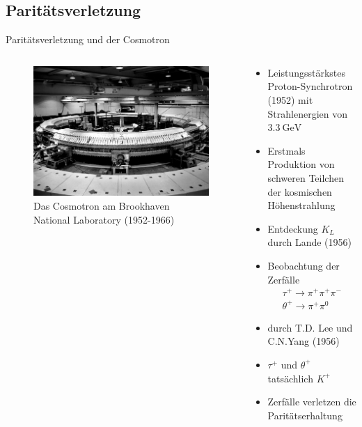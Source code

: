 \documentclass[aspectratio=1610, professionalfonts, 9pt, t]{beamer}
\begin{document}
\subsection{Paritätsverletzung}

  \begin{frame}{Paritätsverletzung und der Cosmotron}
    \begin{columns}[onlytextwidth]
      \begin{column}{0.4\textwidth}
        \begin{figure}[ht]
          \begin{center}
            \includegraphics[height=0.6\textheight]{Images/cosmotron.jpg} %
            \caption{Das Cosmotron am Brookhaven National Laboratory (1952-1966)\cite{cosmotron}}
          \end{center}
        \end{figure}
      \end{column}
      \begin{column}{0.5\textwidth}
        \begin{itemize}
          \item Leistungsstärkstes Proton-Synchrotron (1952) mit Strahlenergien von $\SI{3.3}{\giga\electronvolt}$
          \item Erstmals Produktion von schweren Teilchen der kosmischen Höhenstrahlung
          \item Entdeckung $K_{L}$ durch Lande (1956) %
          \item Beobachtung der Zerfälle
          \begin{align*}
            \tau^{+} \rightarrow \pi^{+} \pi^{+} \pi^{-} \\
            \theta^{+} \rightarrow \pi^{+} \pi^{0}
          \end{align*}
          \item[] durch T.D. Lee und C.N.Yang (1956)
          \item $\tau^{+}$ und $\theta^{+}$ tatsächlich $K^{+}$
          \item[\rightarrow] Zerfälle verletzen die Paritätserhaltung
        \end{itemize}
      \end{column}
    \end{columns}
  \end{frame}
\end{document}
